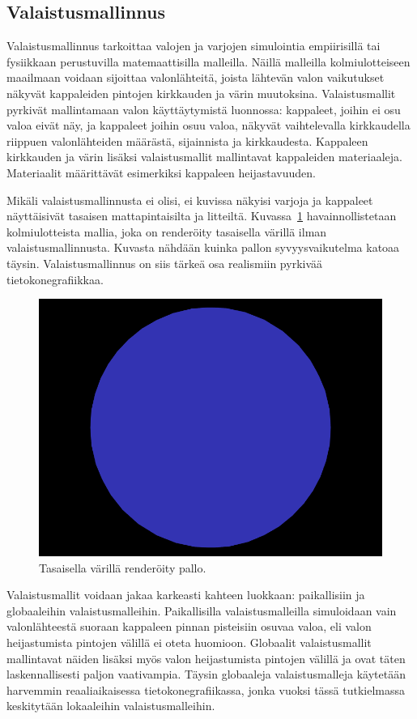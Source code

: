 \documentclass[finnish]{tktltiki2}
\theoremstyle{definition}
\theoremstyle{remark}
\begin{document}
\subsection{Valaistusmallinnus}
Valaistusmallinnus tarkoittaa valojen ja varjojen simulointia empiirisillä tai fysiikkaan perustuvilla matemaattisilla malleilla. Näillä malleilla kolmiulotteiseen maailmaan voidaan sijoittaa valonlähteitä, joista lähtevän valon vaikutukset näkyvät kappaleiden pintojen kirkkauden ja värin muutoksina. Valaistusmallit pyrkivät mallintamaan valon käyttäytymistä luonnossa: kappaleet, joihin ei osu valoa eivät näy, ja kappaleet joihin osuu valoa, näkyvät vaihtelevalla kirkkaudella riippuen valonlähteiden määrästä, sijainnista ja kirkkaudesta. Kappaleen kirkkauden ja värin lisäksi valaistusmallit mallintavat kappaleiden materiaaleja. Materiaalit määrittävät esimerkiksi kappaleen heijastavuuden.

Mikäli valaistusmallinnusta ei olisi, ei kuvissa näkyisi varjoja ja kappaleet näyttäisivät tasaisen mattapintaisilta ja litteiltä. Kuvassa~\ref{fig:Ambient} havainnollistetaan kolmiulotteista mallia, joka on renderöity tasaisella värillä ilman valaistusmallinnusta. Kuvasta nähdään kuinka pallon syvyysvaikutelma katoaa täysin. Valaistusmallinnus on siis tärkeä osa realismiin pyrkivää tietokonegrafiikkaa.
\begin{figure}[h]
\centering
\includegraphics[scale=0.6]{img/ambient_crop.png}
\caption{Tasaisella värillä renderöity pallo.}
\label{fig:Ambient}
\end{figure}

Valaistusmallit voidaan jakaa karkeasti kahteen luokkaan: paikallisiin ja globaaleihin valaistusmalleihin. Paikallisilla valaistusmalleilla simuloidaan vain valonlähteestä suoraan kappaleen pinnan pisteisiin osuvaa valoa, eli valon heijastumista pintojen välillä ei oteta huomioon. Globaalit valaistusmallit mallintavat näiden lisäksi myös valon heijastumista pintojen välillä ja ovat täten  laskennallisesti paljon vaativampia. Täysin globaaleja valaistusmalleja käytetään harvemmin reaaliaikaisessa tietokonegrafiikassa, jonka vuoksi tässä tutkielmassa keskitytään lokaaleihin valaistusmalleihin.
\end{document}
